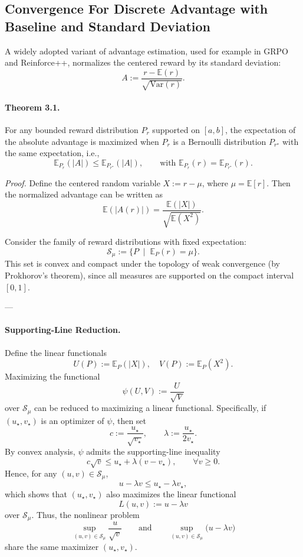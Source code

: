 \documentclass{article} %
\begin{document}
\subsection{Convergence For Discrete Advantage with Baseline and Standard Deviation}
\label{chapter:appendix_proof_normalize}

A widely adopted variant of advantage estimation, used for example in GRPO and Reinforce++, normalizes the centered reward by its standard deviation:  
\[
A := \frac{r - \mathbb{E}(r)}{\sqrt{\mathrm{Var}(r)}}.
\]


\paragraph{Theorem 3.1.}  For any bounded reward distribution $P_r$ supported on $[a,b]$, the expectation of the absolute advantage is maximized when $P_r$ is a Bernoulli distribution $P_{r^\star}$ with the same expectation, i.e.,
\[
\mathbb{E}_{P_r}(|A|) \le \mathbb{E}_{P_{r^\star}}(|A|),
\qquad \text{with } \mathbb{E}_{P_r}(r) = \mathbb{E}_{P_{r^\star}}(r).
\]  


\textit{Proof.}  
Define the centered random variable $X := r - \mu$, where $\mu = \mathbb{E}[r]$. Then the normalized advantage can be written as
\[
\mathbb{E}(|A(r)|) = \frac{\mathbb{E}(|X|)}{\sqrt{\mathbb{E}(X^2)}}.
\]  


Consider the family of reward distributions with fixed expectation:
\[
\mathcal{S}_\mu := \{ P \;\mid\; \mathbb{E}_P(r) = \mu \}.
\]
This set is convex and compact under the topology of weak convergence (by Prokhorov’s theorem), since all measures are supported on the compact interval $[0,1]$.  

---


\paragraph{Supporting-Line Reduction.}  
Define the linear functionals
\[
U(P) := \mathbb{E}_P(|X|), 
\quad 
V(P) := \mathbb{E}_P(X^2).
\]
Maximizing the functional
\[
\psi(U,V) := \frac{U}{\sqrt{V}}
\]
over $\mathcal{S}_\mu$ can be reduced to maximizing a linear functional. Specifically, if $(u_\star, v_\star)$ is an optimizer of $\psi$, then set
\[
c := \frac{u_\star}{\sqrt{v_\star}}, 
\qquad 
\lambda := \frac{u_\star}{2 v_\star}.
\]
By convex analysis, $\psi$ admits the supporting-line inequality
\[
c \sqrt{v} \le u_\star + \lambda (v - v_\star), \qquad \forall v \ge 0.
\]
Hence, for any $(u,v) \in \mathcal{S}_\mu$,
\[
u - \lambda v \le u_\star - \lambda v_\star,
\]
which shows that $(u_\star, v_\star)$ also maximizes the linear functional
\[
L(u,v) := u - \lambda v
\]
over $\mathcal{S}_\mu$. Thus, the nonlinear problem
\[
\sup_{(u,v) \in \mathcal{S}_\mu} \frac{u}{\sqrt{v}}
\qquad\text{and}\qquad
\sup_{(u,v) \in \mathcal{S}_\mu} \big(u - \lambda v\big)
\]
share the same maximizer $(u_\star,v_\star)$.  
\end{document}
